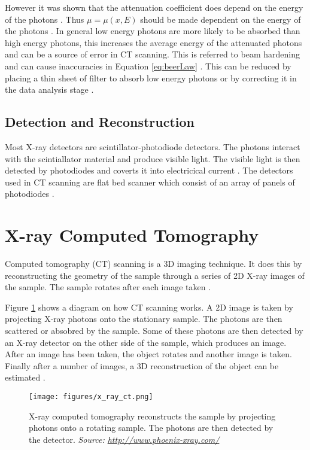 \documentclass[12pt, a4paper]{memoir}
\begin{document}
However it was shown that the attenuation coefficient does depend on the energy of the photons \citep{elbakri2002statistical}. Thus $\mu=\mu(x,E)$ should be made dependent on the energy of the photons \citep{cantatore2011introduction}. In general low energy photons are more likely to be absorbed than high energy photons, this increases the average energy of the attenuated photons and can be a source of error in CT scanning. This is referred to beam hardening and can cause inaccuracies in Equation \eqref{eq:beerLaw} \citep{michael2001x}. This can be reduced by placing a thin sheet of filter to absorb low energy photons \citep{welkenhuyzen2009industrial} or by correcting it in the data analysis stage \citep{michael2001x}.

\subsection{Detection and Reconstruction}
Most X-ray detectors are scintillator-photodiode detectors. The photons interact with the scintiallator material and produce visible light. The visible light is then detected by photodiodes and coverts it into electricical current \citep{michael2001x}. The detectors used in CT scanning are flat bed scanner which consist of an array of panels of photodiodes \citep{cantatore2011introduction}.

\section{X-ray Computed Tomography}
Computed tomography (CT) scanning is a 3D imaging technique. It does this by reconstructing the geometry of the sample through a series of 2D X-ray images of the sample. The sample rotates after each image taken \citep{cantatore2011introduction}.

Figure \ref{fig:x_ray_ct} shows a diagram on how CT scanning works. A 2D image is taken by projecting X-ray photons onto the stationary sample. The photons are then scattered or absobred by the sample.  Some of these photons are then detected by an X-ray detector on the other side of the sample, which produces an image. After an image has been taken, the object rotates and another image is taken. Finally after a number of images, a 3D reconstruction of the object can be estimated \citep{cantatore2011introduction}.

\begin{figure}
\centering
\texttt{[image: figures/x\_ray\_ct.png]}
\caption{X-ray computed tomography reconstructs the sample by projecting photons onto a rotating sample. The photons are then detected by the detector. \emph{Source: \url{http://www.phoenix-xray.com/}}}
\label{fig:x_ray_ct}
\end{figure}
\end{document}
